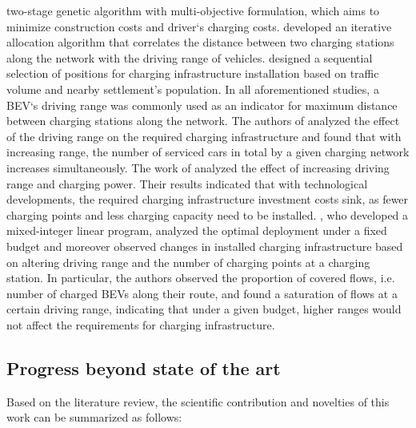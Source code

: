 \documentclass[journal,article,submit,pdftex,moreauthors]{Definitions/mdpi}
\begin{document}
two-stage genetic algorithm with multi-objective formulation, which aims to minimize construction costs and driver`s charging costs. \citet{Napoli2020} developed an iterative allocation algorithm that correlates the distance between two charging stations along the network with the driving range of vehicles. \citet{Csiszar2020} designed a sequential selection of positions for charging infrastructure installation based on traffic volume and nearby settlement's population. In all aforementioned studies, a BEV`s driving range was commonly used as an indicator for maximum distance between charging stations along the network. The authors of \cite{Csiszar2020} analyzed the effect of the driving range on the required charging infrastructure and found that with increasing range, the number of serviced cars in total by a given charging network increases simultaneously. The work of \citet{Kavianipour2021} analyzed the effect of increasing driving range and charging power. Their results indicated that with technological developments, the required charging infrastructure investment costs sink, as fewer charging points and less charging capacity need to be installed. \citet{WANG20181255}, who developed a mixed-integer linear program, analyzed the optimal deployment under a fixed budget and moreover observed changes in installed charging infrastructure based on altering driving range and the number of charging points at a charging station. In particular, the authors observed the proportion of covered flows, i.e. number of charged BEVs along their route, and found a saturation of flows at a certain driving range, indicating that under a given budget, higher ranges would not affect the requirements for charging infrastructure. 
     
    

    \subsection{Progress beyond state of the art}
    Based on the literature review, the scientific contribution and novelties of this work can be summarized as follows:  
    
\end{document}
